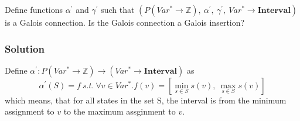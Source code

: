 Define functions $\alpha^\prime$ and $\gamma^\prime$ such that $(P(Var^*\rightarrow \mathbb{Z}),\ \alpha^\prime,\ \gamma^\prime,\ Var^*\rightarrow \mathbf{Interval})$ is a Galois connection. Is the Galois connection a Galois insertion?

\subsubsection*{Solution}
Define $\alpha^\prime:P(Var^*\rightarrow \mathbb{Z})\rightarrow (Var^*\rightarrow \mathbf{Interval})$ as
\begin{equation*}
\alpha^{'}(S)=f\ s.t.\ \forall v\in Var^*.f(v)=[\min\limits_{s\in S}s(v),\ \max\limits_{s\in S}s(v)]
\end{equation*}
which means, that for all states in the set S, the interval is from the minimum assignment to $v$ to the maximum assginment to $v$.\\

